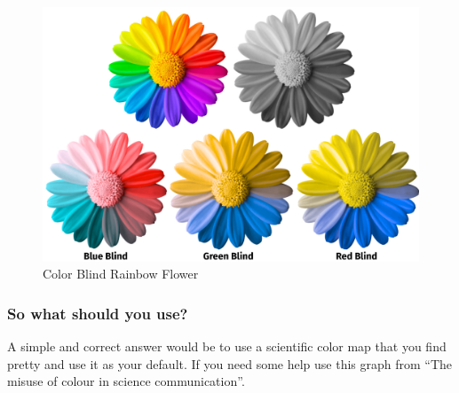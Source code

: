 \documentclass[
  letterpaper,
]{book}
\begin{document}
\begin{figure}

{\centering \includegraphics[width=6.92708in,height=\textheight]{./images/Color_Blindness.jpg}

}

\caption{Color Blind Rainbow Flower}

\end{figure}

\hypertarget{so-what-should-you-use}{%
\subsubsection{So what should you use?}\label{so-what-should-you-use}}

A simple and correct answer would be to use a scientific color map that
you find pretty and use it as your default. If you need some help use
this graph from ``The misuse of colour in science communication''.
\end{document}
